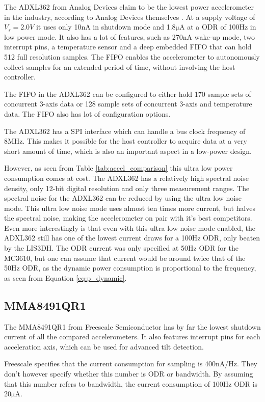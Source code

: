 The ADXL362 from Analog Devices claim to be the lowest power accelerometer in the industry, according to Analog Devices themselves \cite{analog12}. At a supply voltage of $V_s = 2.0 V$ it uses only 10nA in shutdown mode and 1.8$\si{\micro\ampere}$ at a ODR of 100Hz in low power mode. It also has a lot of features, such as 270nA wake-up mode, two interrupt pins, a temperature sensor and a deep embedded FIFO that can hold 512 full resolution samples. The FIFO enables the accelerometer to autonomously collect samples for an extended period of time, without involving the host controller.

The FIFO in the ADXL362 can be configured to either hold 170 sample sets of concurrent 3-axis data or 128 sample sets of concurrent 3-axis and temperature data. The FIFO also has lot of configuration options.  

The ADXL362 has a SPI interface which can handle a bus clock frequency of 8MHz. This makes it possible for the host controller to acquire data at a very short amount of time, which is also an important aspect in a low-power design.

However, as seen from Table \ref{tab:accel_comparison} this ultra low power consumption comes at cost. The ADXL362 has a relatively high spectral noise density, only 12-bit digital resolution and only three measurement ranges. The spectral noise for the ADXL362 can be reduced by using the ultra low noise mode. This ultra low noise mode uses almost ten times more current, but halves the spectral noise, making the accelerometer on pair with it's best competitors. Even more interestingly is that even with this ultra low noise mode enabled, the ADXL362 still has one of the lowest current draws for a 100Hz ODR, only beaten by the LIS3DH. The ODR current was only specified at 50Hz ODR for the MC3610, but one can assume that current would be around twice that of the 50Hz ODR, as the dynamic power consumption is proportional to the frequency, as seen from Equation \ref{eq:p_dynamic}.

\subsection{MMA8491QR1}

The MMA8491QR1 from Freescale Semiconductor has by far the lowest shutdown current of all the compared accelerometers. It also features interrupt pins for each acceleration axis, which can be used for advanced tilt detection.

Freescale specifies that the current consumption for sampling is 400nA/Hz. They don't however specify whether this number is ODR or bandwidth. By assuming that this number refers to bandwidth, the current consumption of 100Hz ODR is 20$\si{\micro\ampere}$. 

